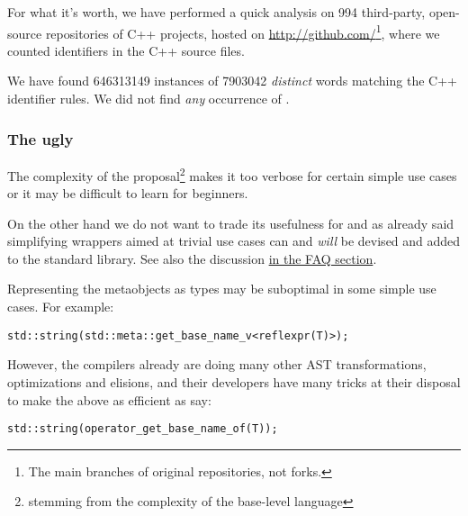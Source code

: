 For what it's worth, we have performed a quick analysis on \num{994} third-party,
open-source repositories of C++ projects, hosted on
\url{http://github.com/}\footnote{The main branches of original repositories,
not forks.}, where we counted identifiers in the C++ source files.

We have found \num{646313149} instances of \num{7903042} {\em distinct} words
matching the C++ identifier rules.  We did not find {\em any} occurrence of
.

\subsubsection{The ugly}

The complexity of the proposal\footnote{stemming from the complexity of the
base-level language} makes it too verbose for certain simple use cases
or it may be difficult to learn for beginners.

On the other hand we do not want to trade its usefulness for 
and as already said simplifying wrappers aimed at trivial use cases can 
and {\em will} be devised and added to the standard library.
See also the discussion \hyperref[faq-hard-on-novices]{in the FAQ section}.

Representing the metaobjects as types may be suboptimal in some simple
use cases. For example:

\begin{verbatim}
std::string(std::meta::get_base_name_v<reflexpr(T)>);
\end{verbatim}

However, the compilers already are doing many other AST transformations,
optimizations and elisions, and their developers have many tricks at their
disposal to make the above as efficient as say:

\begin{verbatim}
std::string(operator_get_base_name_of(T));
\end{verbatim}

